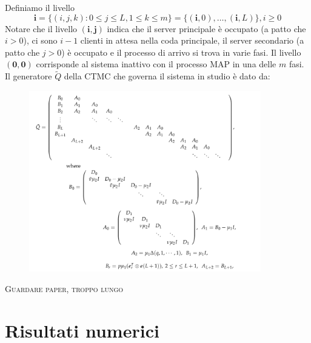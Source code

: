 \documentclass[11pt]{article}
\begin{document}
\noindent Definiamo il livello
$$\textbf{i} = \{(i, j, k) : 0 \leq j \leq L, 1 \leq k \leq m\} = \{(\textbf{i}, 0), \dots, (\textbf{i}, L)\}, i \geq 0$$
Notare che il livello $(\textbf{i},\textbf{j})$ indica che il server principale è occupato (a patto che $i>0$), ci sono $i-1$ clienti in attesa nella coda principale, il server secondario (a patto che $j>0$) è occupato e il processo di arrivo si trova in varie fasi. Il livello $(\textbf{0},\textbf{0})$ corrisponde al sistema inattivo con il processo MAP in una delle $m$ fasi. Il generatore $\widetilde{Q}$ della CTMC che governa il sistema in studio è dato da:
\begin{figure}[h!]
    \centering
    \includegraphics[width=0.9\textwidth]{FcngTm3.png}
    \label{fig:GI-M-1}
\end{figure}

\textsc{Guardare paper, troppo lungo}

\section{Risultati numerici}
\end{document}
